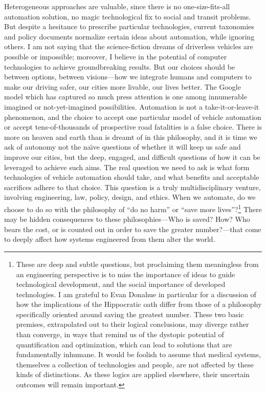 Heterogeneous
approaches are valuable, since there is no one-size-fits-all
automation solution, no magic technological fix to social and transit
problems. But despite a hesitance to prescribe particular
technologies, current taxonomies and policy documents normalize
certain ideas about automation, while ignoring others. I am not saying that
the science-fiction dreams of 
driverless vehicles are possible or impossible; moreover, I believe in the
potential of computer technologies to achieve groundbreaking results.
But our choices should be between options, between
visions---how we integrate humans and computers to make our
driving safer, our cities more livable, our lives better. The Google model which has
captured so much press attention is one among innumerable imagined or
not-yet-imagined possibilities. Automation is not a
take-it-or-leave-it phenomenon, and the choice to accept one
particular model of vehicle automation or accept tens-of-thousands of
prospective road fatalities is a false choice. There is more on heaven
and earth than is dreamt of in this philosophy, and it is time we ask
of autonomy not the na\"{\i}ve questions of whether it will keep us
safe and improve our cities, but the deep, engaged, and difficult
questions of how it can be leveraged to achieve such aims. The real
question we need to ask is what form technologies of vehicle automation 
should take, and what benefits and acceptable sacrifices adhere to
that choice. This question is a truly multidisciplinary venture,
involving engineering, law, policy, design, and ethics. When we
automate, do we choose to do so with the philosophy of ``do no harm''
or ``save more lives''?\footnote{These are deep and subtle questions,
  but proclaiming them meaningless from an engineering perspective is
  to miss the importance of ideas to guide technological development,
  and the social importance of developed technologies. I am grateful
  to Evan Donahue in particular for a discussion of how the
  implications of the Hippocratic oath differ from those of a
  philosophy specifically oriented around saving the greatest number.
  These two basic premises, extrapolated out to their logical
  conclusions, may diverge rather than converge, in ways that remind
  us of the dystopic potential of quantification and optimization,
  which can lead to solutions that are fundamentally inhumane. It
  would be foolish 
  to assume that medical systems, themselves a collection of
  technologies and people, are not affected by these kinds of
  distinctions. As these logics are applied elsewhere, their uncertain
  outcomes
  will remain important.} There may be hidden consequences to these 
philosophies---Who is saved? How? Who bears the cost, or is
counted out in order to save the greater number?---that come to deeply
affect how systems engineered from them alter the world.


